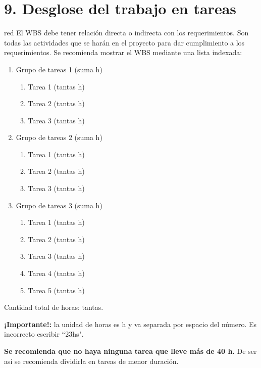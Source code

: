 \documentclass[
    11pt, %
]{charter}
\begin{document}
    \section{9. Desglose del trabajo en tareas}
    \label{sec:wbs}

    \begin{consigna}{red}
        El WBS debe tener relación directa o indirecta con los requerimientos. Son todas las actividades que se harán en el proyecto para dar cumplimiento a los requerimientos. Se recomienda mostrar el WBS mediante una lista indexada:

        \begin{enumerate}
            \item Grupo de tareas 1 (suma h)
            \begin{enumerate}
                \item Tarea 1 (tantas h)
                \item Tarea 2 (tantas h)
                \item Tarea 3 (tantas h)
            \end{enumerate}
            \item Grupo de tareas 2 (suma h)
            \begin{enumerate}
                \item Tarea 1 (tantas h)
                \item Tarea 2 (tantas h)
                \item Tarea 3 (tantas h)
            \end{enumerate}
            \item Grupo de tareas 3 (suma h)
            \begin{enumerate}
                \item Tarea 1 (tantas h)
                \item Tarea 2 (tantas h)
                \item Tarea 3 (tantas h)
                \item Tarea 4 (tantas h)
                \item Tarea 5 (tantas h)
            \end{enumerate}
        \end{enumerate}

        Cantidad total de horas: tantas.

        \textbf{¡Importante!:} la unidad de horas es h y va separada por espacio del número. Es incorrecto escribir ``23hs".

        \textbf{Se recomienda que no haya ninguna tarea que lleve más de 40 h.} De ser así se recomienda dividirla en tareas de menor duración.

    \end{consigna}
\end{document}
